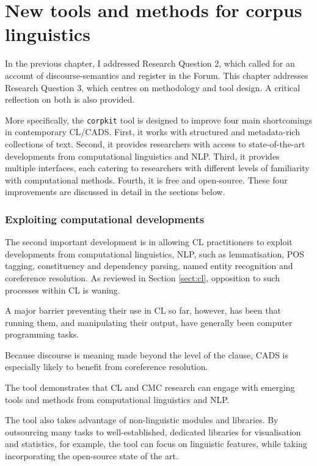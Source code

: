 
\chapter{New tools and methods for corpus linguistics} \label{chap:discuss-method}

In the previous chapter, I addressed Research Question 2, which called for an account of discourse-semantics and register in the Forum.  This chapter addresses Research Question 3, which centres on methodology and tool design. A critical reflection on both is also provided.


More specifically, the \texttt{corpkit} tool is designed to improve four main shortcomings in contemporary \gls{CL}\slash \gls{CADS}. First, it works with structured and metadata-rich collections of text. Second, it provides researchers with access to state-of-the-art developments from computational linguistics and NLP. Third, it provides multiple interfaces, each catering to researchers with different levels of familiarity with computational methods. Fourth, it is free and open-source. These four improvements are discussed in detail in the sections below.

\subsection{Exploiting computational developments}

The second important development is in allowing \gls{CL} practitioners to exploit developments from computational linguistics, \gls{NLP}, such as lemmatisation, POS tagging, constituency and dependency parsing, named entity recognition and coreference resolution. As reviewed in Section \ref{sect:cl}, opposition to such processes within \gls{CL} is waning.

A major barrier preventing their use in \gls{CL} so far, however, has been that running them, and manipulating their output, have generally been computer programming tasks.

Because discourse is meaning made beyond the level of the clause, \gls{CADS} is especially likely to benefit from coreference resolution.

The tool demonstrates that \gls{CL} and \gls{CMC} research can engage with emerging tools and methods from computational linguistics and \gls{NLP}.


The tool also takes advantage of non-linguistic modules and libraries. By outsourcing many tasks to well-established, dedicated libraries for visualisation and statistics, for example, the tool can focus on linguistic features, while taking incorporating the open-source state of the art.
















